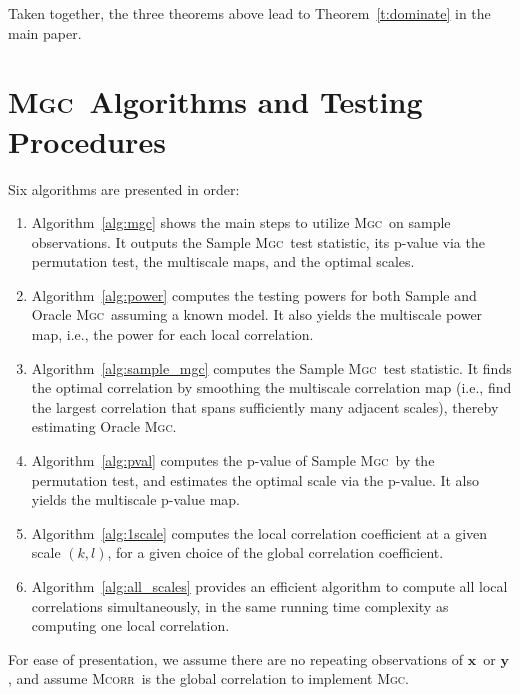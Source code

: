 \documentclass[11pt]{article}
\providecommand{\sct}[1]{{\normalfont\textsc{#1}}}
\providecommand{\mb}[1]{\boldsymbol{#1}}
\newcommand{\Mgc}{\sct{Mgc}}
\newcommand{\Mcorr}{\sct{Mcorr}}
\newcommand{\website}{\url{https://github.com/neurodata/MGC/}}
\newcommand{\mbx}{\ensuremath{\mb{x}}}
\newcommand{\mby}{\ensuremath{\mb{y}}}
\begin{document}
Taken together, the three theorems above lead to Theorem~\ref{t:dominate} in the main paper.


\clearpage

\section{\Mgc~Algorithms and Testing Procedures}
\label{appen:algorithms}




Six algorithms are presented in order:
\begin{enumerate}
\item Algorithm~\ref{alg:mgc} shows the main steps to utilize \Mgc~on sample observations. It outputs the Sample \Mgc~test statistic, its p-value via the permutation test, the multiscale maps, and the optimal scales.
\item Algorithm~\ref{alg:power} computes the testing powers for both Sample and Oracle \Mgc~assuming a known model. It also yields the multiscale power map, i.e., the power for each local correlation.
\item Algorithm~\ref{alg:sample_mgc} computes the Sample \Mgc~test statistic. It finds the optimal correlation by smoothing the multiscale correlation map (i.e., find the largest correlation that spans sufficiently many adjacent scales), thereby estimating Oracle \Mgc.
\item Algorithm~\ref{alg:pval} computes the p-value of Sample \Mgc~by the permutation test, and estimates the optimal scale via the p-value. It also yields the multiscale p-value map. 
\item Algorithm~\ref{alg:1scale} computes the local correlation coefficient at a given scale $(k,l)$, for a given choice of the global correlation coefficient.
\item Algorithm~\ref{alg:all_scales} provides an efficient algorithm to compute all local correlations simultaneously, in the same running time complexity as computing one local correlation. 
\end{enumerate}
For ease of presentation, we assume there are no repeating observations of \mbx~or \mby, and assume \Mcorr~is the global correlation to implement \Mgc.
\end{document}
